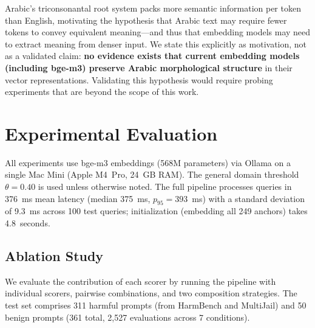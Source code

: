 \documentclass[11pt]{article}
\begin{document}
Arabic's triconsonantal root system packs more semantic information per token than English, motivating the hypothesis that Arabic text may require fewer tokens to convey equivalent meaning---and thus that embedding models may need to extract meaning from denser input.
We state this explicitly as motivation, not as a validated claim: \textbf{no evidence exists that current embedding models (including bge-m3) preserve Arabic morphological structure} in their vector representations.
Validating this hypothesis would require probing experiments that are beyond the scope of this work.

\section{Experimental Evaluation}
\label{sec:eval}

All experiments use bge-m3 embeddings (568M parameters) \cite{chen2024bgem3} via Ollama on a single Mac Mini (Apple M4~Pro, 24~GB RAM).
The general domain threshold $\theta{=}0.40$ is used unless otherwise noted.
The full pipeline processes queries in 376~ms mean latency (median 375~ms, $p_{95}{=}393$~ms) with a standard deviation of 9.3~ms across 100 test queries; initialization (embedding all 249 anchors) takes 4.8~seconds.

\subsection{Ablation Study}
\label{sec:ablation}

We evaluate the contribution of each scorer by running the pipeline with individual scorers, pairwise combinations, and two composition strategies.
The test set comprises 311 harmful prompts (from HarmBench and MultiJail) and 50 benign prompts (361 total, 2{,}527 evaluations across 7 conditions).
\end{document}
